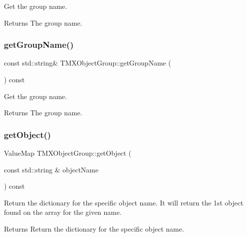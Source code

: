 Get the group name.

\begin{DoxyReturn}{Returns}
The group name. 
\end{DoxyReturn}
\mbox{\label{classTMXObjectGroup_a64c2197f8730ebd449086e0c1ee4d3f7}} 
\subsubsection{\texorpdfstring{get\+Group\+Name()}{getGroupName()}\hspace{0.1cm}{\footnotesize\ttfamily [2/2]}}
{\footnotesize\ttfamily const std\+::string\& T\+M\+X\+Object\+Group\+::get\+Group\+Name (\begin{DoxyParamCaption}{ }\end{DoxyParamCaption}) const\hspace{0.3cm}{\ttfamily [inline]}}

Get the group name.

\begin{DoxyReturn}{Returns}
The group name. 
\end{DoxyReturn}
\mbox{\label{classTMXObjectGroup_adc5371f496124537ac76e97426a8f5db}} 
\subsubsection{\texorpdfstring{get\+Object()}{getObject()}\hspace{0.1cm}{\footnotesize\ttfamily [1/2]}}
{\footnotesize\ttfamily Value\+Map T\+M\+X\+Object\+Group\+::get\+Object (\begin{DoxyParamCaption}\item[{const std\+::string \&}]{object\+Name }\end{DoxyParamCaption}) const}

Return the dictionary for the specific object name. It will return the 1st object found on the array for the given name.

\begin{DoxyReturn}{Returns}
Return the dictionary for the specific object name. 
\end{DoxyReturn}
\mbox{\label{classTMXObjectGroup_adc5371f496124537ac76e97426a8f5db}} 
